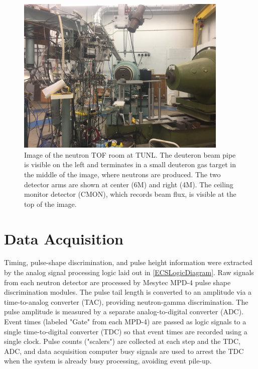 \begin{figure}[h]
    \centering
    \includegraphics[width = 0.9\textwidth]{figures/TOFRoomPhoto.jpg}
    \caption[Image of the neutron TOF room at TUNL] 
    {
    Image of the neutron TOF room at TUNL. The deuteron beam pipe is visible on the left and
    terminates in a small deuteron gas target in the middle of the image, where neutrons are
    produced. The two detector arms are shown at center (6M) and right (4M). The ceiling
    monitor detector (CMON), which records beam flux, is visible at the top of the image.
    }
    \label{TOFRoomPhoto}
\end{figure}

\section{Data Acquisition}
Timing, pulse-shape discrimination, and pulse height information were
extracted by the analog signal processing logic laid out in \ref{ECSLogicDiagram}.
Raw signals from each neutron detector are processed by Mesytec MPD-4
pulse shape discrimination modules. The pulse tail length is converted to an
amplitude via a time-to-analog converter (TAC), providing neutron-gamma
discrimination. The pulse amplitude is measured by a separate
analog-to-digital converter (ADC). Event times (labeled "Gate" from each MPD-4)
are passed as logic signals to a single time-to-digital converter (TDC) so that
event times are recorded using a single clock. Pulse counts ("scalers") are
collected at each step and the TDC, ADC, and data acquisition computer busy
signals are used to arrest the TDC when the system is already busy processing,
avoiding event pile-up.

